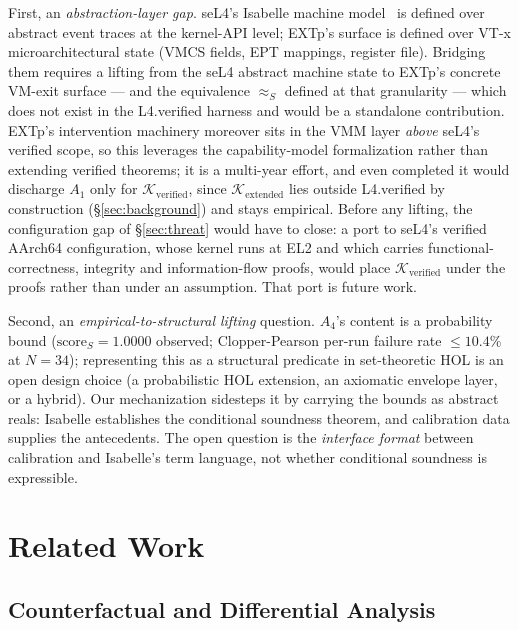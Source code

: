\documentclass[conference]{IEEEtran}
\newcommand{\Kverified}{\mathcal{K}_\text{verified}}
\newcommand{\Kextended}{\mathcal{K}_\text{extended}}
\newcommand{\scoreS}{\text{score}_S}
\begin{document}
First, an \emph{abstraction-layer gap}. seL4's Isabelle machine
model~\cite{klein2014sel4} is defined over abstract event traces at
the kernel-API level; EXTp's surface is defined over VT-x
microarchitectural state (VMCS fields, EPT mappings, register
file). Bridging them requires a lifting from the seL4 abstract
machine state to EXTp's concrete VM-exit surface --- and the
equivalence $\approx_S$ defined at that granularity --- which does
not exist in the L4.verified harness and would be a standalone
contribution. EXTp's intervention machinery moreover sits in the
VMM layer \emph{above} seL4's verified scope, so this leverages the
capability-model formalization rather than extending verified
theorems; it is a multi-year effort, and even completed it would
discharge $A_1$ only for $\Kverified$, since $\Kextended$ lies
outside L4.verified by construction (\S\ref{sec:background}) and
stays empirical. Before any lifting, the configuration gap of
\S\ref{sec:threat} would have to close: a port to seL4's verified
AArch64 configuration, whose kernel runs at EL2 and which carries
functional-correctness, integrity and information-flow proofs, would
place $\Kverified$ under the proofs rather than under an assumption.
That port is future work.

Second, an \emph{empirical-to-structural lifting} question. $A_4$'s
content is a probability bound ($\scoreS{=}1.0000$ observed;
Clopper-Pearson per-run failure rate $\leq 10.4\%$ at $N{=}34$);
representing this as a structural predicate in set-theoretic HOL is
an open design choice (a probabilistic HOL extension, an axiomatic
envelope layer, or a hybrid). Our mechanization sidesteps it by
carrying the bounds as abstract reals: Isabelle establishes the
conditional soundness theorem, and calibration data supplies the
antecedents. The open question is the \emph{interface format}
between calibration and Isabelle's term language, not whether
conditional soundness is expressible.

\section{Related Work}\label{sec:related}

\subsection{Counterfactual and Differential Analysis}
\end{document}
